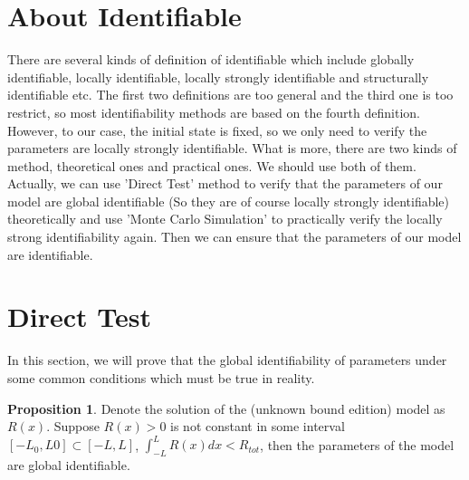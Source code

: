 \documentclass[12pt]{extarticle}
\begin{document}
\section{About Identifiable}
\label{sect:AboutIdentifiable}

There are several kinds of definition of identifiable which include globally identifiable, locally identifiable, locally strongly identifiable and structurally identifiable etc. The first two definitions are too general and the third one is too restrict, so most identifiability methods are based on the fourth definition. However, to our case, the initial state is fixed, so we only need to verify the parameters are locally strongly identifiable. What is more, there are two kinds of method, theoretical ones and practical ones. We should use both of them. Actually, we can use 'Direct Test' method to verify that the parameters of our model are global identifiable (So they are of course locally strongly identifiable) theoretically and use 'Monte Carlo Simulation' to practically verify the locally strong identifiability again. Then we can ensure that the parameters of our model are identifiable. 

\section{Direct Test}
\label{sect:DirectTest}

In this section, we will prove that the global identifiability of parameters under some common conditions which must be true in reality.

\theoremstyle{definition} \newtheorem{proposition}{Proposition}

\begin{proposition} \label{proposition:box}
 Denote the solution of the (unknown bound edition) model as $R(x)$. Suppose $R(x)>0$ is not constant in some interval $[-L_{0},L{0}]\subset[-L,L]$, $\int_{-L}^{L}R(x)dx<R_{tot}$, then the parameters of the model are global identifiable. 
\end{proposition}
\end{document}
